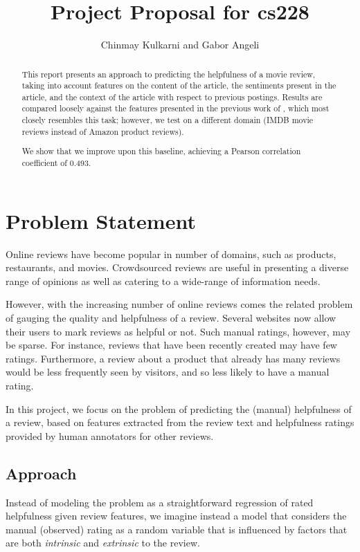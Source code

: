 \documentclass[12pt,letterpaper]{article}
\title{Project Proposal for cs228}
\author{Chinmay Kulkarni and Gabor Angeli}
\begin{document}
\maketitle

\begin{abstract}
This report presents an approach to predicting the helpfulness of a 
	movie review, taking into account features on the content of the article, 
	the sentiments present in the article, and the context of the article
	with respect to previous postings.
Results are compared loosely against the features presented in
	the previous work of 
	, which most closely resembles this task;
	however, we test on a different domain (IMDB movie
	reviews instead of Amazon product reviews).

We show that we improve upon this baseline, achieving a Pearson correlation
	coefficient of 0.493.
\end{abstract}


\section{Problem Statement}

Online reviews have become popular in number of domains, such as products, restaurants, and movies. Crowdsourced reviews are useful in presenting a diverse range of opinions as well as catering to a wide-range of information needs. 

However, with the increasing number of online reviews comes the related problem of gauging the quality and helpfulness of a review. Several websites now allow their users to mark reviews as helpful or not. Such manual ratings, however, may be sparse. For instance, reviews that have been recently created may have few ratings. Furthermore, a review about a product that already has many reviews would be less frequently seen by visitors, and so less likely to have a manual rating.  

In this project, we focus on the problem of predicting the (manual) helpfulness of a review, based on features extracted from the review text and  helpfulness ratings provided by human annotators for other reviews. 


\subsection{Approach}
Instead of modeling the problem as a straightforward regression of rated helpfulness given review features, we imagine instead a model that considers the manual (observed) rating as a random variable that is influenced by factors that are both {\em intrinsic} and {\em extrinsic} to the review. 
\end{document}
